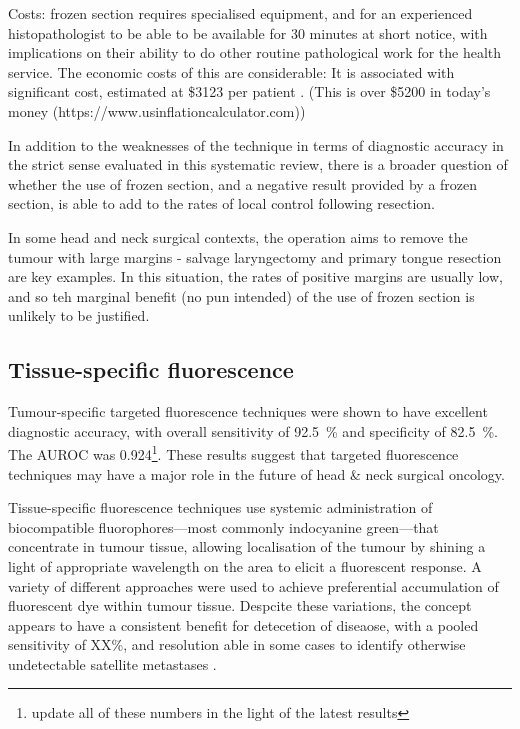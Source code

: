 Costs: frozen section requires specialised equipment, and for an experienced histopathologist to be able to be available for 30 minutes at short notice, with implications on their ability to do other routine pathological work for the health service. 
The economic costs of this are considerable: 
It is associated with significant cost, estimated at \$3123 per patient \cite{dinardoAccuracyUtilityCost2000}. 
(This is over \$5200 in today's money (https://www.usinflationcalculator.com))

In addition to the weaknesses of the technique in terms of diagnostic accuracy in the strict sense evaluated in this systematic review, there is a broader question of whether the use of frozen section, and a negative result provided by a frozen section, is able to add to the rates of local control following resection.

In some head and neck surgical contexts, the operation aims to remove the tumour with large margins - salvage laryngectomy and primary tongue resection are key examples. 
In this situation, the rates of positive margins are usually low, and so teh marginal benefit (no pun intended) of the use of frozen section is unlikely to be justified.





\subsection{Tissue-specific fluorescence}

Tumour-specific targeted fluorescence techniques were shown to have excellent diagnostic accuracy, with overall sensitivity of \SI{92.5}{\percent} and specificity of \SI{82.5}{\percent}. 
The AUROC was 0.924\footnote{update all of these numbers in the light of the latest results}. 
These results suggest that targeted fluorescence techniques may have a major role in the future of head \& neck surgical oncology.

Tissue-specific fluorescence techniques use systemic administration of biocompatible fluorophores---most commonly indocyanine green---that concentrate in tumour tissue, allowing localisation of the tumour  by shining a light of appropriate wavelength on the area to elicit a fluorescent response.
A variety of different approaches were used to achieve preferential accumulation of fluorescent dye within tumour tissue.
Despcite these variations, the concept appears to have a consistent benefit for detecetion of diseaose, with a pooled sensitivity of XX\%, and resolution able in some cases to identify otherwise undetectable satellite metastases \cite{voskuilf.j.ImageguidedSurgeryTumor2019}.

